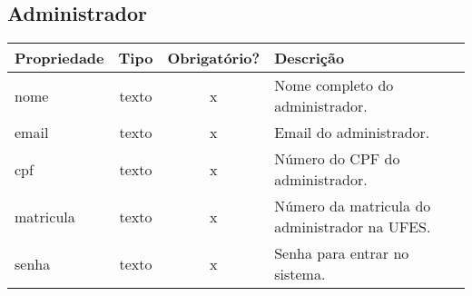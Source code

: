 \newpage

\subsection{Administrador} \label{Administrador}
\begin{table}[h!]
	\footnotesize
	\begin{tabular}{|p{2.6cm}|c|c|p{7.8cm}|}   \hline \rowcolor[rgb]{0.8,0.8,0.8}
	
		
 		\textbf{Propriedade} & \textbf{Tipo} & \textbf{Obrigatório?} & \centerline{\textbf{Descrição}} \\\hline  	
 		                            
		nome & texto & x & Nome completo do administrador. \\\hline 
		
		email & texto & x & Email do administrador. \\\hline 
		                             
		cpf & texto & x & Número do CPF do administrador. \\\hline 
		
		matricula & texto & x & Número da matricula do administrador na UFES. \\\hline 
		
		senha & texto & x & Senha para entrar no sistema. \\\hline 
		
	\end{tabular}	
\end{table}


